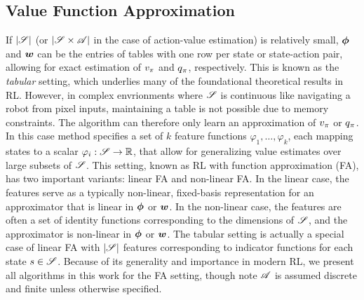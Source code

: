   \subsection{Value Function Approximation} 
  If $|\mathscr{S}|$ (or $|\mathscr{S} \times \mathscr{A}|$ in the case of action-value estimation) is relatively small, ${\bm \phi}$ and ${\bm w}$ can be the entries of tables with one row per state or state-action pair, allowing for exact estimation of $v_{\pi}$ and $q_{\pi}$, respectively. This is known as the \textit{tabular} setting, which underlies many of the foundational theoretical results in RL.
  However, in complex envrionments where $\mathscr{S}$ is continuous like navigating a robot from pixel inputs, 
  maintaining a table is not possible due to memory constraints. The algorithm can therefore only learn an approximation of $v_{\pi}$ or $q_{\pi}$. In this case method specifies a set of $k$ feature functions $\varphi_1, \dots, \varphi_k$, each mapping states to a scalar $\varphi_i : \mathscr{S} \to \mathbb{R}$, that allow for generalizing value estimates over large subsets of $\mathscr{S}$. This setting, known as RL with function approximation (FA), has two important variants: linear FA and non-linear FA. In the linear case, the features serve as a typically non-linear, fixed-basis representation for an approximator that is linear in ${\bm \phi}$ or ${\bm w}$. In the non-linear case, the features are often a set of identity functions corresponding to the dimensions of $\mathscr{S}$, and the approximator is non-linear in ${\bm \phi}$ or ${\bm w}$. The tabular setting is actually a special case of linear FA with $|\mathscr{S}|$ features corresponding to indicator functions for each state $s \in \mathscr{S}$. Because of its generality and importance in modern RL, we present all algorithms in this work for the FA setting, though note $\mathscr{A}$ is assumed discrete and finite unless otherwise specified. 
  
